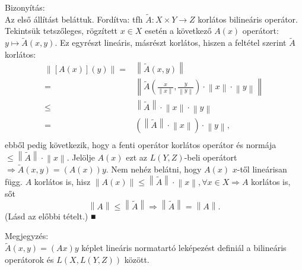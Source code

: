 \documentclass[12pt,a4paper]{scrartcl}
\newenvironment{bizonyitas}{}{}
\newenvironment{megjegyzes}{}{}
\begin{document}
\begin{bizonyitas}

Bizonyítás:\\
Az első állítást beláttuk. Fordítva: tfh
\(\left. \widetilde{A}:X \times Y\rightarrow Z \right.\) korlátos
bilineáris operátor. Tekintsük tetszőleges, rögzített \(x \in X\) esetén
a következő \(A\left( x \right)\) operátort:
\(\left. y\mapsto\widetilde{A}\left( {x,y} \right) \right.\). Ez
egyrészt lineáris, másrészt korlátos, hiszen a feltétel szerint
\(\widetilde{A}\) korlátos: \[\begin{aligned}
  \left\| {\left[ {A\left( x \right)} \right]\left( y \right)} \right\| =  & \left\| {\tilde A\left( {x,y} \right)} \right\| \\ 
   =  & \left\| {\tilde A\left( {\frac{x}{{\left\| x \right\|}},\frac{y}{{\left\| y \right\|}}} \right) \cdot \left\| x \right\| \cdot \left\| y \right\|} \right\| \\ 
   \leqslant  & \left\| {\tilde A} \right\| \cdot \left\| x \right\| \cdot \left\| y \right\| \\ 
   =  & \left( {\left\| {\tilde A} \right\| \cdot \left\| x \right\|} \right) \cdot \left\| y \right\|, \\ 
\end{aligned} \] ebből pedig következik, hogy a fenti operátor korlátos
operátor és normája
\(\leq \left\| \widetilde{A} \right\| \cdot \left\| x \right\|\).
Jelölje \(A\left( x \right)\) ezt az \(L\left( {Y,Z} \right)\)-beli
operátort
\(\left. \Rightarrow\widetilde{A}\left( {x,y} \right) = \left( {A\left( x \right)} \right)y \right.\).
Nem nehéz belátni, hogy \(A\left( x \right)\) \(x\)-től lineárisan függ.
\(A\) korlátos is, hisz
\(\left. \left\| {A\left( x \right)} \right\| \leq \left\| \widetilde{A} \right\| \cdot \left\| x \right\|,\forall x \in X\Rightarrow A \right.\)
korlátos is, sőt
\[\left. \left\| A \right\| \leq \left\| \widetilde{A} \right\|\Rightarrow\left\| \widetilde{A} \right\| = \left\| A \right\|. \right.\]
(Lásd az előbbi tételt.) ■

\end{bizonyitas}

\begin{megjegyzes}

Megjegyzés:\\
\(\widetilde{A}\left( {x,y} \right) = \left( {Ax} \right)y\) képlet
lineáris normatartó leképezést definiál a bilineáris operátorok és
\(L\left( {X,L\left( {Y,Z} \right)} \right)\) között.

\end{megjegyzes}
\end{document}
